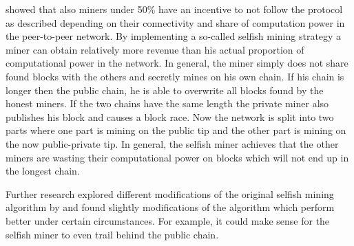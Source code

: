 \documentclass{scrartcl}
\begin{document}
\citeauthor{eyal2014majority} showed that also miners under 50\% have an incentive to not follow the protocol as described depending on their connectivity and share of computation power in the peer-to-peer network.
By implementing a so-called selfish mining strategy a miner can obtain relatively more revenue than his actual proportion of computational power in the network.
In general, the miner simply does not share found blocks with the others and secretly mines on his own chain.
If his chain is longer then the public chain, he is able to overwrite all blocks found by the honest miners.
If the two chains have the same length the private miner also publishes his block and causes a block race.
Now the network is split into two parts where one part is mining on the public tip and the other part is mining on the now public-private tip.
In general, the selfish miner achieves that the other miners are wasting their computational power on blocks which will not end up in the longest chain.


Further research \cite{nayak2016stubborn,sapirshtein2016optimal, gervais2015tampering, gervais2016security, bahack2013theoretical} explored different modifications of the original selfish mining algorithm by \citeauthor{eyal2014majority} and found slightly modifications of the algorithm which perform better under certain circumstances.
For example, it could make sense for the selfish miner to even trail behind the public chain.
\end{document}
